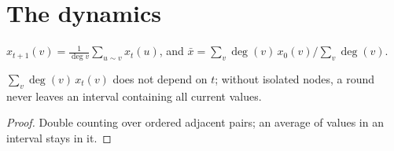 \begin{abstract}
We formalize the averaging dynamics on a finite graph, in which every node replaces its value by
the average of its neighbours' values: the degree-weighted sum is conserved, the values stay in
the initial range, and on a connected graph with an odd closed walk all values converge to the
degree-weighted average of the initial values; on a connected bipartite graph they need not
converge. The distance to the limit decays like $\lambda^t$, with $\lambda$ the second largest
absolute eigenvalue of the random walk (Lovász); in the random sequential version, where one random
edge averages its endpoints, the expected state evolves by the matrix $I-L/2m$. On a
well-clustered regular graph started from random signs, the sign of the last change recovers the two clusters exactly (Becchetti, Clementi, Natale, Pasquale, Trevisan, SODA 2017).
\end{abstract}

\section{The dynamics}
\begin{definition}[Averaging]\label{def:avg}
\leanok
$x_{t+1}(v)=\frac1{\deg v}\sum_{u\sim v}x_t(u)$, and $\bar x=\sum_v\deg(v)\,x_0(v)/\sum_v\deg(v)$.
\end{definition}
\begin{lemma}\label{lem:basic}
\leanok{}
$\sum_v\deg(v)\,x_{t}(v)$ does not depend on $t$; without isolated nodes, a round never leaves an
interval containing all current values.
\end{lemma}
\begin{proof}\leanok
Double counting over ordered adjacent pairs; an average of values in an interval stays in it.
\end{proof}


